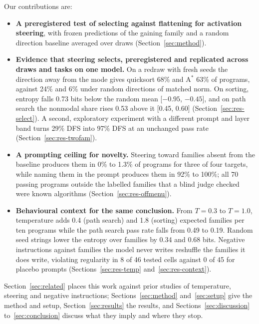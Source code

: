 \documentclass[11pt,letterpaper]{article}
\newcommand{\Astar}{A$^{*}$}
\begin{document}
Our contributions are:
\begin{itemize}
  \item \textbf{A preregistered test of selecting against flattening for activation steering}, with frozen predictions of the gaining family and a random direction baseline averaged over draws (Section~\ref{sec:method}).
  \item \textbf{Evidence that steering selects, preregistered and replicated across draws and tasks on one model.} On a redraw with fresh seeds the direction away from the mode gives quicksort 68\% and \Astar{} 63\% of programs, against 24\% and 6\% under random directions of matched norm. On sorting, entropy falls 0.73 bits below the random mean [$-0.95$, $-0.45$], and on path search the nonmodal share rises 0.53 above it [0.45, 0.60] (Section~\ref{sec:res-select}). A second, exploratory experiment with a different prompt and layer band turns 29\% DFS into 97\% DFS at an unchanged pass rate (Section~\ref{sec:res-twofam}).
  \item \textbf{A prompting ceiling for novelty.} Steering toward families absent from the baseline produces them in 0\% to 1.3\% of programs for three of four targets, while naming them in the prompt produces them in 92\% to 100\%; all 70 passing programs outside the labelled families that a blind judge checked were known algorithms (Section~\ref{sec:res-offmenu}).
  \item \textbf{Behavioural context for the same conclusion.} From $T = 0.3$ to $T = 1.0$, temperature adds 0.4 (path search) and 1.8 (sorting) expected families per ten programs while the path search pass rate falls from 0.49 to 0.19. Random seed strings lower the entropy over families by 0.34 and 0.68 bits. Negative instructions against families the model never writes reshuffle the families it does write, violating regularity in 8 of 46 tested cells against 0 of 45 for placebo prompts (Sections~\ref{sec:res-temp} and~\ref{sec:res-context}).
\end{itemize}

Section~\ref{sec:related} places this work against prior studies of temperature, steering and negative instructions; Sections~\ref{sec:method} and~\ref{sec:setup} give the method and setup, Section~\ref{sec:results} the results, and Sections~\ref{sec:discussion} to~\ref{sec:conclusion} discuss what they imply and where they stop.
\end{document}
